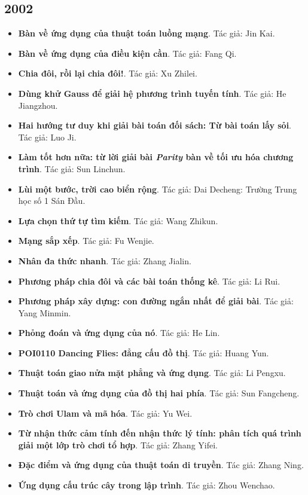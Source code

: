 \documentclass[11pt]{article}
\begin{document}
\subsection{2002}
\begin{itemize}[leftmargin=2em]
  \item \textbf{Bàn về ứng dụng của thuật toán luồng mạng}. Tác giả: Jin Kai.
  \item \textbf{Bàn về ứng dụng của điều kiện cần}. Tác giả: Fang Qi.
  \item \textbf{Chia đôi, rồi lại chia đôi!}. Tác giả: Xu Zhilei.
  \item \textbf{Dùng khử Gauss để giải hệ phương trình tuyến tính}. Tác giả: He Jiangzhou.
  \item \textbf{Hai hướng tư duy khi giải bài toán đối sách: Từ bài toán lấy sỏi}. Tác giả: Luo Ji.
  \item \textbf{Làm tốt hơn nữa: từ lời giải bài \textit{Parity} bàn về tối ưu hóa chương trình}. Tác giả: Sun Linchun.
  \item \textbf{Lùi một bước, trời cao biển rộng}. Tác giả: Dai Decheng: Trường Trung học số 1 Sán Đầu.
  \item \textbf{Lựa chọn thứ tự tìm kiếm}. Tác giả: Wang Zhikun.
  \item \textbf{Mạng sắp xếp}. Tác giả: Fu Wenjie.
  \item \textbf{Nhân đa thức nhanh}. Tác giả: Zhang Jialin.
  \item \textbf{Phương pháp chia đôi và các bài toán thống kê}. Tác giả: Li Rui.
  \item \textbf{Phương pháp xây dựng: con đường ngắn nhất để giải bài}. Tác giả: Yang Minmin.
  \item \textbf{Phỏng đoán và ứng dụng của nó}. Tác giả: He Lin.
  \item \textbf{POI0110 Dancing Flies: đẳng cấu đồ thị}. Tác giả: Huang Yun.
  \item \textbf{Thuật toán giao nửa mặt phẳng và ứng dụng}. Tác giả: Li Pengxu.
  \item \textbf{Thuật toán và ứng dụng của đồ thị hai phía}. Tác giả: Sun Fangcheng.
  \item \textbf{Trò chơi Ulam và mã hóa}. Tác giả: Yu Wei.
  \item \textbf{Từ nhận thức cảm tính đến nhận thức lý tính: phân tích quá trình giải một lớp trò chơi tổ hợp}. Tác giả: Zhang Yifei.
  \item \textbf{Đặc điểm và ứng dụng của thuật toán di truyền}. Tác giả: Zhang Ning.
  \item \textbf{Ứng dụng cấu trúc cây trong lập trình}. Tác giả: Zhou Wenchao.
\end{itemize}
\end{document}
